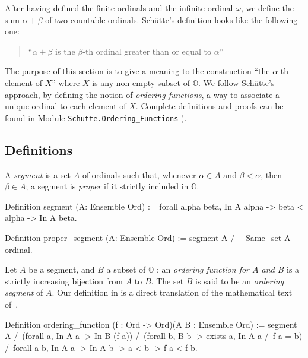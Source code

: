 {After having defined the finite ordinals and the infinite ordinal $\omega$, we  define the sum $\alpha+\beta$ of two countable ordinals.
Schütte's definition looks like the following one:

\begin{quote}
``$\alpha+\beta$ is the $\beta$-th ordinal greater than or equal to $\alpha$''
\end{quote}


The purpose of this section is to give a meaning to the construction
``the $\alpha$-th element of $X$''  where $X$ is any non-empty subset of $\mathbb{O}$.
We follow Schütte's approach, by defining the notion of \emph{ordering functions},
a way to associate a unique ordinal to each element of $X$.
Complete definitions and proofs can be found in Module
 \href{../theories/html/hydras.Schutte.Ordering_Functions.html}%
{\texttt{Schutte.Ordering\_Functions}} ).

\subsection{Definitions}

A \emph{segment} is a set $A$ of ordinals such that, whenever  $\alpha\in A$ and
$\beta<\alpha$, then $\beta\in A$; a segment is  \emph{proper} if it strictly included in $\mathbb{O}$.

\begin{Coqsrc}
 Definition segment (A: Ensemble Ord) :=
  forall alpha beta, In A alpha -> beta < alpha -> In A  beta.

Definition proper_segment (A: Ensemble Ord) :=
  segment A /\ ~ Same_set A ordinal.
\end{Coqsrc}


Let  $A$ be a segment, and $B$ a subset of $\mathbb{O}$ : an \emph{ordering function for $A$ and  $B$} is a strictly increasing bijection from $A$ to $B$.
The set $B$ is said to be an \emph{ordering segment} of $A$.
Our definition in \coq{} is a direct translation of the mathematical text of~\cite{schutte}.


\begin{Coqsrc}
Definition ordering_function (f : Ord -> Ord)(A B : Ensemble Ord) :=
 segment A /\
 (forall a, In A a -> In B (f a)) /\
 (forall b, B b -> exists a, In A a /\ f a = b) /\
 forall a b, In A a -> In A b -> a < b ->  f a < f b.


\end{Coqsrc}}
